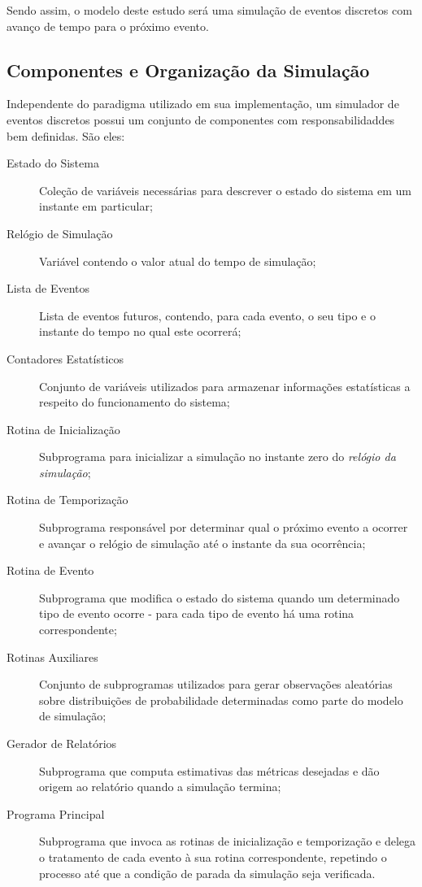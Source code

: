 Sendo assim, o modelo deste estudo será uma simulação de eventos discretos com avanço de tempo para o próximo evento.

\subsection{\label{subsec:simulation:components}Componentes e Organização da
Simulação}

Independente do paradigma utilizado em sua implementação, um simulador de
eventos discretos possui um conjunto de componentes com responsabilidaddes bem
definidas. São eles:

\begin{description}
\item[Estado do Sistema] Coleção de variáveis necessárias para descrever o estado do sistema em um instante em particular;
\item[Relógio de Simulação] Variável contendo o valor atual do tempo de simulação;
\item[Lista de Eventos] Lista de eventos futuros, contendo, para cada evento, o
seu tipo e o instante do tempo no qual este ocorrerá;
\item[Contadores Estatísticos] Conjunto de variáveis utilizados para armazenar informações estatísticas a respeito do funcionamento do sistema;
\item[Rotina de Inicialização] Subprograma para inicializar a simulação no
instante zero do \textit{relógio da simulação};
\item[Rotina de Temporização] Subprograma responsável por determinar qual o
próximo evento a ocorrer e avançar o relógio de simulação até o instante da sua
ocorrência;
\item[Rotina de Evento] Subprograma que modifica o estado do sistema quando um determinado tipo de evento ocorre - para cada tipo de evento há uma rotina
correspondente;
\item[Rotinas Auxiliares] Conjunto de subprogramas utilizados para gerar observações aleatórias sobre distribuições de probabilidade determinadas como parte do modelo de simulação;
\item[Gerador de Relatórios] Subprograma que computa estimativas das métricas desejadas e dão origem ao relatório quando a simulação termina;
\item[Programa Principal] Subprograma que invoca as rotinas de inicialização e temporização e delega o tratamento de cada evento à sua rotina correspondente, repetindo o processo até que a condição de parada da simulação seja verificada.
\end{description}

